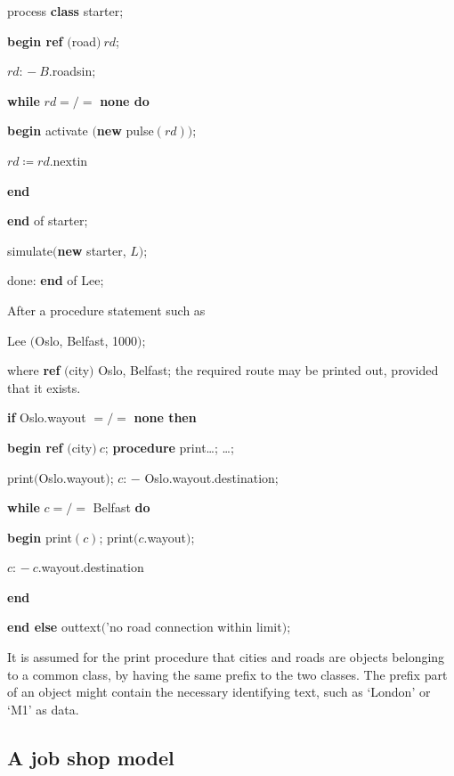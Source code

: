 \quad \quad \quad process \textbf{class} starter;

\quad \quad \quad \quad \textbf{begin ref} $($road$)\ rd$;

\quad \quad \quad \quad \quad $rd$: $-\ B$.roadsin;

\quad \quad \quad \quad \quad \textbf{while} $rd =/=$ \textbf{none do}

\quad \quad \quad \quad \quad \quad \textbf{begin} activate $($\textbf{new} pulse$(rd))$;

\quad \quad \quad \quad \quad \quad \quad \quad $rd \coloneq rd$.nextin

\quad \quad \quad \quad \quad \quad \textbf{end}

\quad \quad \quad \quad \textbf{end} of starter;

\quad \quad \quad \quad simulate$($\textbf{new} starter, $L)$;

\quad \quad done: \textbf{end} of Lee;

\noindent
After a procedure statement such as

\quad Lee $($Oslo, Belfast, 1000$)$;

\noindent
where \textbf{ref} $($city$)$ Oslo, Belfast; the required route may be printed out, provided that it exists.

\quad \textbf{if} Oslo.wayout $=/=$ \textbf{none then}

\quad \textbf{begin ref} $($city$)\ c$; \textbf{procedure} print\dots; \dots;

\quad \quad print$($Oslo.wayout$)$; $c$: $-$ Oslo.wayout.destination;

\quad \quad \textbf{while} $c =/=$ Belfast \textbf{do}

\quad \quad \textbf{begin} print$(c)$; print$(c$.wayout$)$;

\quad \quad \quad $c$: $-\ c$.wayout.destination

\quad \quad \textbf{end}

\quad \textbf{end else} outtext$($'no road connection within limit$)$;

\noindent
It is assumed for the print procedure that cities and roads are objects belonging to a common class, by having the same prefix to the two classes. The prefix part of an object might contain the necessary identifying text, such as `London' or `M1' as data.

\subsection{A job shop model}

